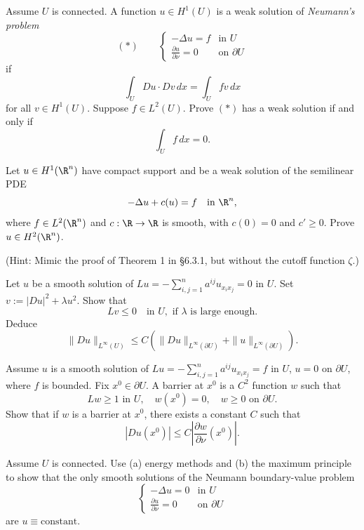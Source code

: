 \begin{exercise}
Assume $U$ is connected. A function $u \in H^1(U)$ is a weak solution of \textit{Neumann's problem}
$$(*) \qquad \begin{cases} -\Delta u = f & \text{in } U \\ \frac{\partial u}{\partial\nu} = 0 & \text{on } \partial U \end{cases}$$
if
$$\int_U Du \cdot Dv\,dx = \int_U fv\,dx$$
for all $v \in H^1(U)$. Suppose $f \in L^2(U)$. Prove $(*)$ has a weak solution if and only if
$$\int_U f\,dx = 0.$$
\end{exercise}

\begin{exercise}
Let $u \in H^1(\R^n)$ have compact support and be a weak solution of the semilinear PDE
$$-\Delta u + c(u) = f \quad \text{in } \R^n,$$
where $f \in L^2(\R^n)$ and $c : \R \to \R$ is smooth, with $c(0) = 0$ and $c' \geq 0$. Prove $u \in H^2(\R^n)$.

(Hint: Mimic the proof of Theorem 1 in \S6.3.1, but without the cutoff function $\zeta$.)
\end{exercise}

\begin{exercise}
Let $u$ be a smooth solution of $Lu = -\sum_{i,j=1}^n a^{ij}u_{x_ix_j} = 0$ in $U$. Set $v := |Du|^2 + \lambda u^2$. Show that
$$Lv \leq 0 \quad \text{in } U, \text{ if } \lambda \text{ is large enough.}$$
Deduce
$$\|Du\|_{L^\infty(U)} \leq C(\|Du\|_{L^\infty(\partial U)} + \|u\|_{L^\infty(\partial U)}).$$
\end{exercise}

\begin{exercise}
Assume $u$ is a smooth solution of $Lu = -\sum_{i,j=1}^n a^{ij}u_{x_ix_j} = f$ in $U$, $u = 0$ on $\partial U$, where $f$ is bounded. Fix $x^0 \in \partial U$. A barrier at $x^0$ is a $C^2$ function $w$ such that
$$Lw \geq 1 \text{ in } U, \quad w(x^0) = 0, \quad w \geq 0 \text{ on } \partial U.$$
Show that if $w$ is a barrier at $x^0$, there exists a constant $C$ such that
$$|Du(x^0)| \leq C\left|\frac{\partial w}{\partial\nu}(x^0)\right|.$$
\end{exercise}

\begin{exercise}
Assume $U$ is connected. Use (a) energy methods and (b) the maximum principle to show that the only smooth solutions of the Neumann boundary-value problem
$$\begin{cases} -\Delta u = 0 & \text{in } U \\ \frac{\partial u}{\partial\nu} = 0 & \text{on } \partial U \end{cases}$$
are $u \equiv \text{constant}$.
\end{exercise}

